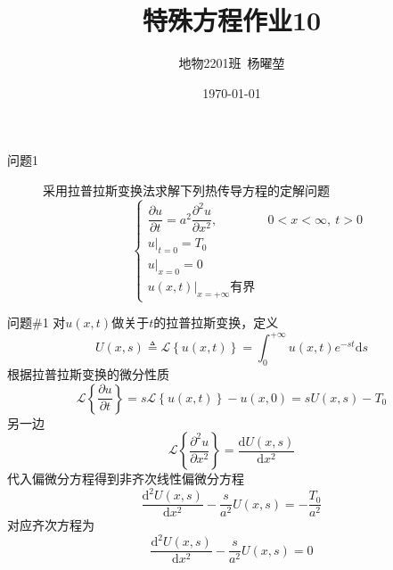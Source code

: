 \documentclass[12pt]{ctexart}
\title{特殊方程作业10}
\author{地物2201班\ 杨曜堃}
\date{\today}
\begin{document}
    \markboth{\theauthor}{\thetitle}
    \maketitle
    \begin{description}
        \item[问题1] 采用拉普拉斯变换法求解下列热传导方程的定解问题$$
        \begin{cases}
            \dfrac{\partial u}{\partial t}=a^2\dfrac{\partial^2u}{\partial x^2},&\ 0<x<\infty,\ t>0\\
            u|_{t=0}=T_0\\
            u|_{x=0}=0\\
            u(x,t)|_{x=+\infty}\text{有界}
        \end{cases}$$
    \end{description}
    \begin{problem}{问题\#1}
        对$u(x,t)$做关于$t$的拉普拉斯变换，定义
        $$
        U(x,s)\triangleq \mathscr{L}\left\{u(x,t)\right\}=\int^{+\infty}_{0}u(x,t)e^{-st}\text{d}s
        $$
        根据拉普拉斯变换的微分性质
        $$
        \mathscr{L}\left\{\dfrac{\partial u}{\partial t}\right\}=s\mathscr{L}\left\{u(x,t)\right\}-u(x,0)=sU(x,s)-T_0
        $$
        另一边
        $$
        \mathscr{L}\left\{\dfrac{\partial^2u}{\partial x^2}\right\}=\dfrac{\text{d}U(x,s)}{\text{d}x^2}
        $$
        代入偏微分方程得到非齐次线性偏微分方程
        $$
        \dfrac{\text{d}^2U(x,s)}{\text{d}x^2}-\dfrac{s}{a^2}U(x,s)=-\dfrac{T_0}{a^2}
        $$
        对应齐次方程为
        $$
        \dfrac{\text{d}^2U(x,s)}{\text{d}x^2}-\dfrac{s}{a^2}U(x,s)=0
        $$
    \end{problem}
\end{document}
